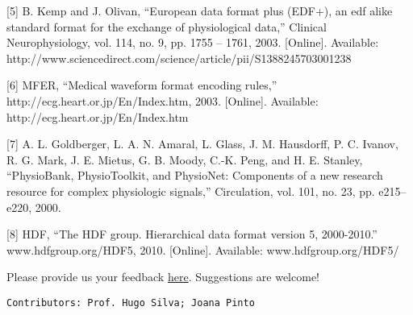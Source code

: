 \documentclass[11pt]{article}
\begin{document}
{[}5{]} B. Kemp and J. Olivan, ``European data format plus (EDF+), an
edf alike standard format for the exchange of physiological data,''
Clinical Neurophysiology, vol. 114, no. 9, pp. 1755 -- 1761, 2003.
{[}Online{]}. Available:
http://www.sciencedirect.com/science/article/pii/S1388245703001238

{[}6{]} MFER, ``Medical waveform format encoding rules,''
http://ecg.heart.or.jp/En/Index.htm, 2003. {[}Online{]}. Available:
http://ecg.heart.or.jp/En/Index.htm

{[}7{]} A. L. Goldberger, L. A. N. Amaral, L. Glass, J. M. Hausdorff, P.
C. Ivanov, R. G. Mark, J. E. Mietus, G. B. Moody, C.-K. Peng, and H. E.
Stanley, ``PhysioBank, PhysioToolkit, and PhysioNet: Components of a new
research resource for complex physiologic signals,'' Circulation, vol.
101, no. 23, pp. e215--e220, 2000.

{[}8{]} HDF, ``The HDF group. Hierarchical data format version 5,
2000-2010.'' www.hdfgroup.org/HDF5, 2010. {[}Online{]}. Available:
www.hdfgroup.org/HDF5/

     

    { Please provide us your feedback {
\href{https://forms.gle/C8TdLQUAS9r8BNJM8}{here}}.} { Suggestions are
welcome! }

    \texttt{Contributors:\ Prof.\ Hugo\ Silva;\ Joana\ Pinto}


    
    
    
    
\end{document}
